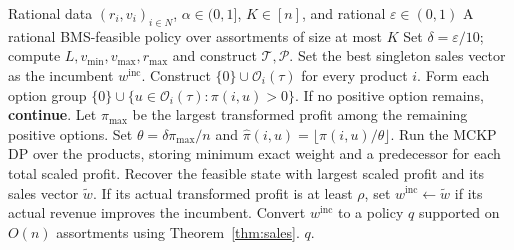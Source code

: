 \documentclass[11pt]{article}
\begin{document}
\begin{algorithm}[H]
\small
\caption{FPTAS for cardinality-constrained randomized BMS}
\label{alg:fptas}
\begin{algorithmic}[1]
\Require Rational data $(r_i,v_i)_{i\in N}$, $\alpha\in(0,1]$, $K\in[n]$, and rational $\varepsilon\in(0,1)$
\Ensure A rational BMS-feasible policy over assortments of size at most $K$
\State Set $\delta=\varepsilon/10$; compute $L,v_{\min},v_{\max},r_{\max}$ and construct $\mathcal T,\mathcal P$.
\State Set the best singleton sales vector as the incumbent $w^{\mathrm{inc}}$.
  \State Construct $\{0\}\cup\mathcal O_i(\tau)$ for every product $i$.
    \State Form each option group $\{0\}\cup\{u\in\mathcal O_i(\tau):\pi(i,u)>0\}$.
    \State If no positive option remains, \textbf{continue}.
    \State Let $\pi_{\max}$ be the largest transformed profit among the remaining positive options.
    \State Set $\theta=\delta\pi_{\max}/n$ and $\widehat\pi(i,u)=\lfloor\pi(i,u)/\theta\rfloor$.
    \State Run the MCKP DP over the products, storing minimum exact weight and a predecessor for each total scaled profit.
    \State Recover the feasible state with largest scaled profit and its sales vector $\widetilde w$.
    \State If its actual transformed profit is at least $\rho$, set $w^{\mathrm{inc}}\gets\widetilde w$ if its actual revenue improves the incumbent.
  \EndFor
\EndFor
\State Convert $w^{\mathrm{inc}}$ to a policy $q$ supported on $O(n)$ assortments using Theorem~\ref{thm:sales}.
\State \Return $q$.
\end{algorithmic}
\end{algorithm}
\end{document}

